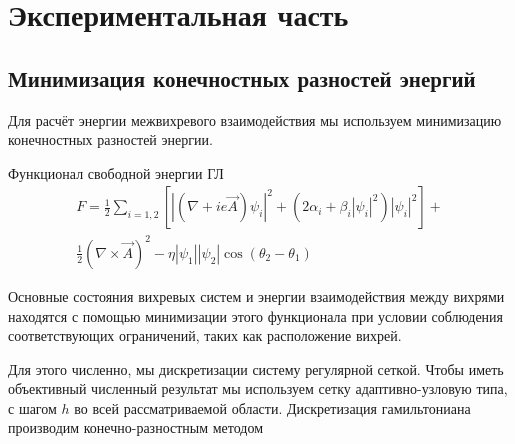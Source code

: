 \chapter{Экспериментальная часть}

\section{Минимизация конечностных разностей энергий}

Для расчёт энергии межвихревого взаимодействия мы используем минимизацию 
конечностных разностей энергии.

Функционал свободной энергии ГЛ
\begin{gather}
    F = \frac{1}{2}\sum\limits_{i=1,2}\left[ 
        \left|\left( \nabla + ie\vec{A}\right)\psi_i\right|^2 + 
        \left( 2\alpha_i + \beta_i |\psi_i|^2 \right)|\psi_i|^2 \right] + 
        \nonumber \\
        \frac{1}{2}\left( \nabla\times\vec{A} \right)^2 - 
        \eta|\psi_1||\psi_2|\cos(\theta_2-\theta_1)
    \label{eqm:1}
\end{gather}

Основные состояния вихревых систем и энергии взаимодействия между вихрями 
находятся с помощью минимизации этого функционала при условии соблюдения 
соответствующих ограничений, таких как расположение вихрей.

Для этого численно, мы дискретизации систему регулярной сеткой. Чтобы иметь 
объективный численный результат мы используем сетку адаптивно-узловую типа, с 
шагом \( h \) во всей рассматриваемой области. Дискретизация гамильтониана 
производим конечно-разностным методом


